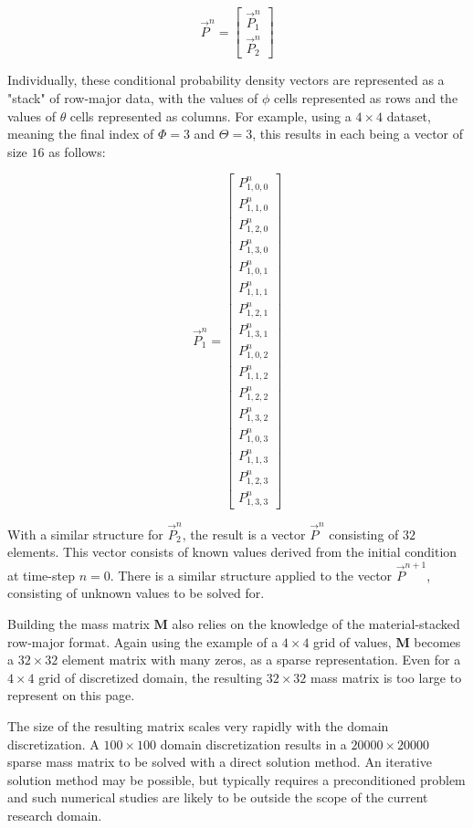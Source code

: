 \documentclass[12pt,a4paper,pagesize=pdftex]{scrartcl}
\begin{document}
\begin{equation*}
    \vec{P}^n =
    \begin{bmatrix}
        \vec{P}^n_1 \\
        \vec{P}^n_2
    \end{bmatrix}
\end{equation*}

Individually, these conditional probability density vectors are represented as a "stack" of row-major data, with the values of \(\phi\) cells represented as rows and the values of \(\theta\) cells represented as columns. For example, using a \(4 \times 4\) dataset, meaning the final index of \(\Phi = 3\) and \(\Theta = 3\), this results in each being a vector of size \(16\) as follows:

\begin{equation*}
    \vec{P}^n_1 =
    \begin{bmatrix}
        P^n_{1,0,0} \\
        P^n_{1,1,0} \\
        P^n_{1,2,0} \\
        P^n_{1,3,0} \\
        P^n_{1,0,1} \\
        P^n_{1,1,1} \\
        P^n_{1,2,1} \\
        P^n_{1,3,1} \\
        P^n_{1,0,2} \\
        P^n_{1,1,2} \\
        P^n_{1,2,2} \\
        P^n_{1,3,2} \\
        P^n_{1,0,3} \\
        P^n_{1,1,3} \\
        P^n_{1,2,3} \\
        P^n_{1,3,3}
    \end{bmatrix}
\end{equation*}

With a similar structure for \(\vec{P}^n_2\), the result is a vector \(\vec{P}^n\) consisting of \(32\) elements. This vector consists of known values derived from the initial condition at time-step \(n=0\). There is a similar structure applied to the vector \(\vec{P}^{n+1}\), consisting of unknown values to be solved for.

Building the mass matrix \(\mathbf{M}\) also relies on the knowledge of the material-stacked row-major format. Again using the example of a \(4 \times 4\) grid of values, \(\mathbf{M}\) becomes a \(32 \times 32\) element matrix with many zeros, as a sparse representation. Even for a \(4 \times 4\) grid of discretized domain, the resulting \(32 \times 32\) mass matrix is too large to represent on this page.

The size of the resulting matrix scales very rapidly with the domain discretization. A \(100 \times 100\) domain discretization results in a \(20000 \times 20000\) sparse mass matrix to be solved with a direct solution method. An iterative solution method may be possible, but typically requires a preconditioned problem and such numerical studies are likely to be outside the scope of the current research domain.
\end{document}
